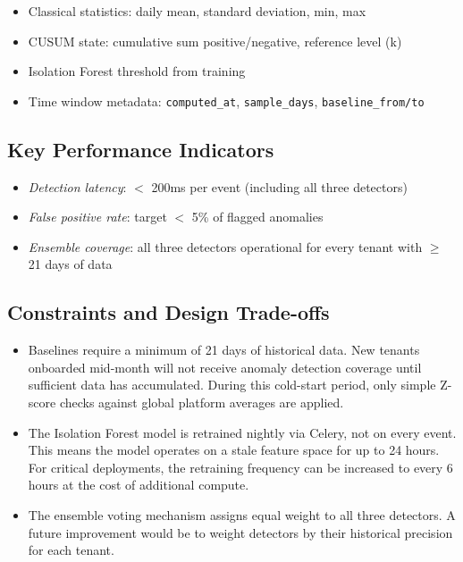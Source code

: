 \documentclass[12pt,a4paper,twoside]{report}
\newcommand{\kpi}[1]{\textit{\textcolor{accentgreen}{#1}}}
\begin{document}
\begin{itemize}
  \item Classical statistics: daily mean, standard deviation, min, max
  \item CUSUM state: cumulative sum positive/negative, reference level (k)
  \item Isolation Forest threshold from training
  \item Time window metadata: \texttt{computed\_at}, \texttt{sample\_days}, \texttt{baseline\_from/to}
\end{itemize}

\subsection{Key Performance Indicators}
\begin{itemize}
  \item \kpi{Detection latency}: $<$ 200ms per event (including all three detectors)
  \item \kpi{False positive rate}: target $<$ 5\% of flagged anomalies
  \item \kpi{Ensemble coverage}: all three detectors operational for every tenant with $\geq$ 21 days of data
\end{itemize}

\subsection{Constraints and Design Trade-offs}
\begin{itemize}
  \item Baselines require a minimum of 21 days of historical data. New tenants onboarded mid-month will not receive anomaly detection coverage until sufficient data has accumulated. During this cold-start period, only simple Z-score checks against global platform averages are applied.
  \item The Isolation Forest model is retrained nightly via Celery, not on every event. This means the model operates on a stale feature space for up to 24 hours. For critical deployments, the retraining frequency can be increased to every 6 hours at the cost of additional compute.
  \item The ensemble voting mechanism assigns equal weight to all three detectors. A future improvement would be to weight detectors by their historical precision for each tenant.
\end{itemize}

\end{document}
